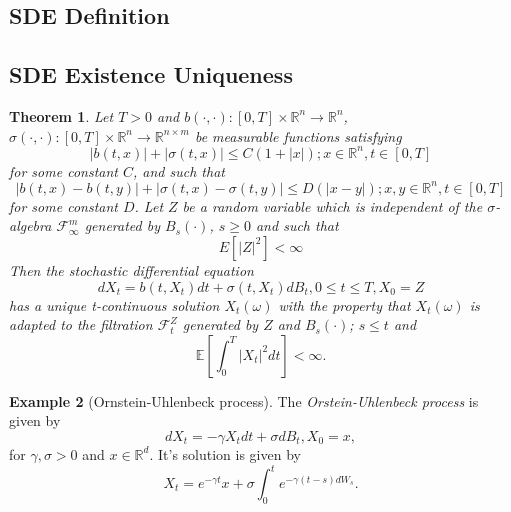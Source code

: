 \documentclass[12pt]{article}
\newtheorem{theorem}{Theorem}[section]
\theoremstyle{definition}
\newtheorem{example}[theorem]{Example}
\numberwithin{equation}{section}
\newcommand{\R}{\mathbb{R}}
\newcommand{\ev}[1]{\mathbb{E}\left[{#1}\right]}
\begin{document}
\subsection{SDE Definition}
\label{subsec:SDEDefinition}


\subsection{SDE Existence Uniqueness}
\label{subsec:SDEExistenceUniqueness}
\begin{theorem}
  Let $T > 0$ and $b(\cdot,\cdot):[0,T] \times \mathbb{R}^n \rightarrow \mathbb{R}^n$, $\sigma(\cdot,\cdot):[0,T] \times \mathbb{R}^n \rightarrow \mathbb{R}^{n \times m}$ be measurable functions satisfying 
  \begin{equation}
    |b(t,x)| + |\sigma(t,x)| \leq C(1+|x|); x \in \mathbb{R}^n, t \in [0,T]
  \end{equation}
  for some constant $C$, and such that 
  \begin{equation}
    |b(t,x) - b(t,y)| + |\sigma(t,x) - \sigma(t,y)| \leq D(|x-y|); x,y \in \mathbb{R}^n, t \in [0,T]
  \end{equation}
  for some constant $D$. Let $Z$ be a random variable which is independent of the $\sigma$-algebra $\mathcal{F}_{\infty}^{m}$ generated by $B_s(\cdot)$, $s\geq 0$ and such that 
  \begin{equation}
    E[|Z|^2] < \infty
  \end{equation}
Then the stochastic differential equation 
\begin{equation}
  dX_t = b(t,X_t)dt + \sigma(t, X_t)dB_t, 0 \leq t \leq T, X_0 = Z
\end{equation}
has a unique t-continuous solution $X_t(\omega)$ with the property that $X_t(\omega)$ is adapted to the filtration $\mathcal{F}_t^Z$ generated by $Z$ and $B_s(\cdot)$; $s \leq t$
and 
\begin{equation}
  \ev{\int_0^T|X_t|^2dt} < \infty.
\end{equation}

\end{theorem}
\begin{example}[Ornstein-Uhlenbeck process]
  The \emph{Orstein-Uhlenbeck process} is given by
  \begin{equation}
    dX_t = -\gamma X_t dt + \sigma dB_t, X_0 = x,
  \end{equation}
  for $\gamma, \sigma > 0$ and $x \in \R^d$.
  It's solution is given by 
  \begin{equation}
    X_t = e^{-\gamma t}x + \sigma \int_0^t e^{-\gamma (t - s) dW_s}.
  \end{equation}
\end{example}
\end{document}
